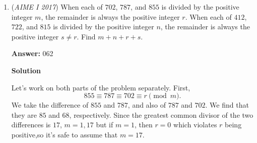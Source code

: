 \begin{enumerate}
 However, it is also possible that two points are on the same line segment, which must be directly opposite to the vertice (because no 3 points can be on the same line). This means that there must be 2 dots on that line segment opposite the vertice. The line segments opposite vertice A, B, and C are BC, AC and AB respectively, which have 4, 5, and 3 dots respectively. This problem asks for us to choose 2 from four, five, and 3 and add them up, which gets $(4,2)+(5,2)+(3,2)=6+10+3=19$ cases.

 In total, for one vertice cases, we have $141+19=160$ cases.This brings the aggregate number of cases to $205+160=365$ cases.

 Case 3: Two Common Vertices

 The only way a triangle could not have an area of greater than 0 is if all three of its vertices are on the same line. Two are already on the same line, so the last point cannot be on the same line as the other two. This is also the two vertice case, so the final point cannot be a vertice. Out of the 12 non-vertice points, 3, 4, or 5 of them will be unavailable, whether if B, A, or C is chosen, respectively. This gives $9+8+7=24$ cases for two-vertice solutions.

 Adding this to the aggregate gives $365+24=389$ cases.

 Case 4: Three Common Vertices

 By trivial, this is the original triangle, which is still a case. This gives 1 three-vertice solution.

 This brings the total number to $390$ cases, which is the final solution. $\boxed{390}$.

 


 


	\item (\textit{AIME I 2017}) When each of $702$, $787$, and $855$ is divided by the positive integer $m$, the remainder is always the positive integer $r$. When each of $412$, $722$, and $815$ is divided by the positive integer $n$, the remainder is always the positive integer $s \neq r$. Find $m+n+r+s$.


 
 \textbf{Answer: }062



\textbf{Solution}

Let's work on both parts of the problem separately. First, 
 \[855 \equiv 787 \equiv 702 \equiv r \pmod{m}.\] We take the difference of $855$ and $787$, and also of $787$ and $702$. We find that they are $85$ and $68$, respectively. Since the greatest common divisor of the two differences is $17$, $m=1,17$ but if $m=1$, then $r=0$ which violates $r$ being positive,so it's safe to assume that $m = 17$.


\end{enumerate}
